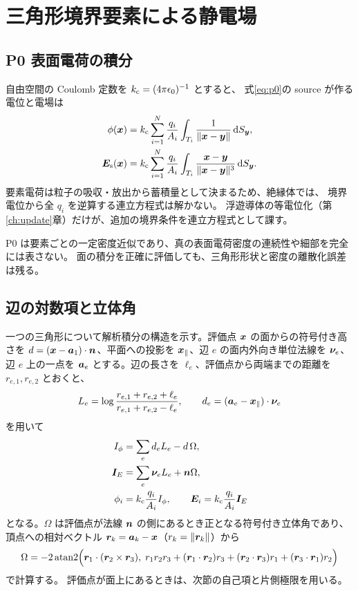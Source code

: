 \chapter{三角形境界要素による静電場}
\label{ch:electrostatics}

\section{P0 表面電荷の積分}
自由空間の Coulomb 定数を $k_{\mathrm c}=(4\pi\epsilon_0)^{-1}$ とすると、
式\eqref{eq:p0}の source が作る電位と電場は
\begin{align}
 \phi(\bm{x})&=k_{\mathrm c}\sum_{i=1}^{N}\frac{q_i}{A_i}
       \int_{T_i}\frac{1}{\lVert\bm{x}-\bm{y}\rVert}\mathop{}\!\mathrm{d} S_{\bm{y}},
       \label{eq:panel_phi}\\
 \bm{E}_{\mathrm s}(\bm{x})&=k_{\mathrm c}\sum_{i=1}^{N}\frac{q_i}{A_i}
       \int_{T_i}\frac{\bm{x}-\bm{y}}
       {\lVert\bm{x}-\bm{y}\rVert^3}\mathop{}\!\mathrm{d} S_{\bm{y}}.
       \label{eq:panel_field}
\end{align}
要素電荷は粒子の吸収・放出から蓄積量として決まるため、絶縁体では、
境界電位から全 $q_i$ を逆算する連立方程式は解かない。
浮遊導体の等電位化（第\ref{ch:update}章）だけが、追加の境界条件を連立方程式として課す。

P0 は要素ごとの一定密度近似であり、真の表面電荷密度の連続性や細部を完全には表さない。
面の積分を正確に評価しても、三角形形状と密度の離散化誤差は残る。

\section{辺の対数項と立体角}
一つの三角形について解析積分の構造を示す\citep{Wilton1984}。評価点 $\bm{x}$ の面からの符号付き高さを
$d=(\bm{x}-\bm{a}_1)\cdot\bm{n}$、平面への投影を $\bm{x}_\parallel$、辺 $e$ の面内外向き単位法線を $\bm{\nu}_e$、
辺 $e$ 上の一点を $\bm{a}_e$ とする。辺の長さを $\ell_e$、評価点から両端までの距離を $r_{e,1},r_{e,2}$ とおくと、
\begin{equation}
 L_e=\log\frac{r_{e,1}+r_{e,2}+\ell_e}
                   {r_{e,1}+r_{e,2}-\ell_e},\qquad
 d_e=(\bm{a}_e-\bm{x}_\parallel)\cdot\bm{\nu}_e
\end{equation}
を用いて
\begin{align}
 I_\phi&=\sum_e d_eL_e-d\,\Omega,\\
 \bm{I}_E&=\sum_e\bm{\nu}_eL_e+\bm{n}\Omega,\\
 \phi_i&=k_{\mathrm c}\frac{q_i}{A_i}I_\phi,\qquad
 \bm{E}_i=k_{\mathrm c}\frac{q_i}{A_i}\bm{I}_E
\end{align}
となる。$\Omega$ は評価点が法線 $\bm{n}$ の側にあるとき正となる符号付き立体角であり、
頂点への相対ベクトル $\bm{r}_k=\bm{a}_k-\bm{x}$（$r_k=\lVert\bm{r}_k\rVert$）から
\begin{equation}
 \Omega=-2\operatorname{atan2}\Bigl(\bm{r}_1\cdot(\bm{r}_2\times\bm{r}_3),\;
 r_1r_2r_3+(\bm{r}_1\cdot\bm{r}_2)r_3+(\bm{r}_2\cdot\bm{r}_3)r_1+(\bm{r}_3\cdot\bm{r}_1)r_2\Bigr)
\end{equation}
で計算する\citep{VanOosterom1983}。
評価点が面上にあるときは、次節の自己項と片側極限を用いる。

